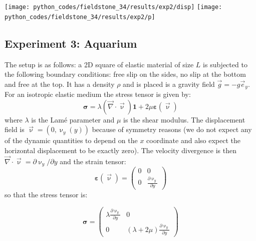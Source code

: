 \begin{center}
\texttt{[image: python\_codes/fieldstone\_34/results/exp2/disp]}
\texttt{[image: python\_codes/fieldstone\_34/results/exp2/p]}
\end{center}





\subsection*{Experiment 3: Aquarium}

The setup is as follows: a 2D square of elastic material of size $L$ is 
subjected to the following boundary conditions: free slip on the sides, no slip at the 
bottom and free at the top. It has a density $\rho$ and is placed is a gravity 
field ${\vec g}=-g {\vec e}_y$.
For an isotropic elastic medium the stress tensor is given by:
\[
{\bm \sigma} = \lambda ({\vec \nabla}\cdot{\vec \upnu}) {\bm 1} + 2 \mu {\bm \varepsilon}(\vec\upnu)
\]
where $\lambda$ is the Lam{\'e} parameter and $\mu$ is the shear modulus.
The displacement field is ${\vec \upnu}=(0,\upnu_y(y))$ because of symmetry reasons 
(we do not expect any of the dynamic quantities to depend on the $x$ coordinate and 
also expect the horizontal displacement to be exactly zero).
The velocity divergence is then ${\vec \nabla}\cdot{\vec \upnu} = \partial \upnu_y/\partial y$
and the strain tensor:
\[
{\bm \varepsilon}(\vec \upnu)
=
\left(
\begin{array}{cc}
0 & 0 \\
0 & \frac{\partial \upnu_y}{\partial y}
\end{array}
\right)
\]
so that the stress tensor is:

\[
{\bm \sigma} =
\left(
\begin{array}{cc}
\lambda \frac{\partial \upnu_y}{\partial y} &  0 \\
0 & (\lambda + 2 \mu) \frac{\partial \upnu_y}{\partial y}
\end{array}
\right)
\]

